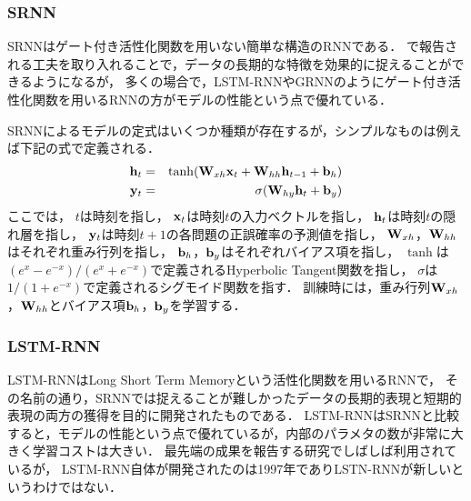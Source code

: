 






\subsubsection{SRNN}
SRNNはゲート付き活性化関数を用いない簡単な構造のRNNである．
\cite{le2015simple, krueger2015regularizing}で報告される工夫を取り入れることで，データの長期的な特徴を効果的に捉えることができるようになるが，
多くの場合で，LSTM-RNNやGRNNのようにゲート付き活性化関数を用いるRNNの方がモデルの性能という点で優れている．

SRNNによるモデルの定式はいくつか種類が存在するが，シンプルなものは例えば下記の式で定義される．
\begin{eqnarray}
\label{eq:srnn1}
{\bf h}_t &=& \tanh({\bf W}_{xh} {\bf x}_t + {\bf W}_{hh}  {\bf h}_{t-1} + {\bf b}_h)\\
\label{eq:srnn2}
{\bf y}_t &=& \sigma( {\bf W}_{hy} {\bf h}_t + {\bf b}_y)
\end{eqnarray}
ここでは，
$t$は時刻を指し，
${\bf x}_t$は時刻$t$の入力ベクトルを指し，
${\bf h}_t$は時刻$t$の隠れ層を指し，
${\bf y}_t$は時刻$t+1$の各問題の正誤確率の予測値を指し，
${\bf W}_{xh}$，${\bf W}_{hh}$はそれぞれ重み行列を指し，
${\bf b}_h$，${\bf b}_y$はそれぞれバイアス項を指し，
$\tanh$は$( e^x - e^{-x} )/( e^x + e^{-x} )$で定義されるHyperbolic Tangent関数を指し，
$\sigma$は$1 / (1 + e^{-x})$で定義されるシグモイド関数を指す．
訓練時には，重み行列${\bf W}_{xh}$，${\bf W}_{hh}$とバイアス項${\bf b}_h$，${\bf b}_y$を学習する．

\subsubsection{LSTM-RNN}
LSTM-RNNはLong Short Term Memoryという活性化関数を用いるRNNで，
その名前の通り，SRNNでは捉えることが難しかったデータの長期的表現と短期的表現の両方の獲得を目的に開発されたものである\cite{hochreiter1997long}．
LSTM-RNNはSRNNと比較すると，モデルの性能という点で優れているが，内部のパラメタの数が非常に大きく学習コストは大きい．
最先端の成果を報告する研究でしばしば利用されているが，
LSTM-RNN自体が開発されたのは1997年でありLSTN-RNNが新しいというわけではない．

